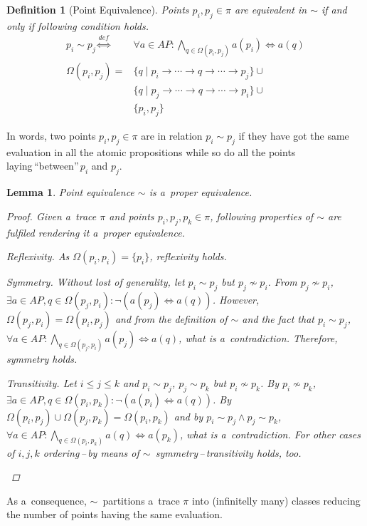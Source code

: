 \documentclass[12pt,twoside,draft]{fithesis}
\newtheorem{mydef}{Definition}
\newtheorem{mylemma}{Lemma}
\begin{document}
\begin{mydef}[Point Equivalence]
Points $p_i,p_j\in\pi$ are equivalent in $\sim$ if and only if following
condition holds.
\begin{align}
	p_i\sim p_j	\overset{def}{\iff}&\forall a\in AP:
		\bigwedge_{q\in\Omega(p_i,p_j)}a(p_i)\iff a(q)\\
\Omega(p_i,p_j)=&\{q\mid p_i\rightarrow\dotsm\rightarrow q
		\rightarrow\dotsm\rightarrow p_j\}\cup\nonumber\\
		&\{q\mid p_j\rightarrow\dotsm\rightarrow q\rightarrow\dotsm
		\rightarrow p_i\}\cup\nonumber\\
		&\{p_i,p_j\}
\end{align}
\end{mydef}
In words, two points $p_i,p_j\in\pi$ are in relation $p_i\sim p_j$ if
they have got the same evaluation in all the atomic propositions while
so do all the points laying\,``between''\,$p_i$ and $p_j$.
\begin{mylemma}
Point equivalence $\sim$ is a~proper equivalence.
\begin{proof}Given a~trace $\pi$ and points $p_i,p_j,p_k\in\pi$,
following properties of $\sim$ are fulfiled rendering it a~proper
equivalence.
	\begin{inparaenum}
		\item{Reflexivity.} As $\Omega(p_i,p_i)=\{p_i\}$,
			reflexivity holds.
		\item{Symmetry.} Without lost of generality, let $p_i\sim p_j$
			but $p_j\not\sim p_i$. From $p_j\not\sim p_i$,
			$\exists a\in AP,q\in\Omega(p_j, p_i):\neg(a(p_j)
			\iff a(q))$. However, $\Omega(p_j, p_i)=\Omega(p_i,p_j)$
			and from the definition of $\sim$ and the fact that
			$p_i\sim p_j$,
			$\forall a\in AP:\bigwedge_{q\in\Omega(p_j,p_i)}a(p_j)\iff
			a(q)$, what is a~contradiction. Therefore, symmetry holds.
		\item{Transitivity.} Let $i\leq j\leq k$ and $p_i\sim p_j$,
			$p_j\sim p_k$ but $p_i\not\sim p_k$. By $p_i\not\sim p_k$,
			$\exists a\in AP, q\in\Omega(p_i, p_k):
			\neg(a(p_i)\iff a(q))$. By
			$\Omega(p_i,p_j)\cup\Omega(p_j,p_k)=\Omega(p_i,p_k)$ and by
			$p_i\sim p_j\wedge p_j\sim p_k$,
			$\forall a\in AP:\bigwedge_{q\in\Omega(p_i,p_k)}a(q)
			\iff a(p_k)$, what is a~contradiction. For other cases of
			$i,j,k$ ordering\,--\,by means of
			$\sim$~symmetry\,--\,transitivity holds, too.
	\end{inparaenum}
	\qedhere
\end{proof}
\end{mylemma}
As a~consequence, $\sim$~partitions a~trace $\pi$ into
(infinitelly many) classes reducing the number of points
having the same evaluation.
\end{document}
